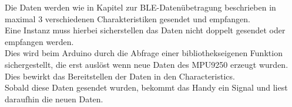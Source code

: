 Die Daten werden wie in Kapitel zur BLE-Datenübetragung beschrieben in maximal
3 verschiedenen Charakteristiken gesendet und empfangen. \\
Eine Instanz muss hierbei sicherstellen das Daten
nicht doppelt gesendet oder empfangen werden.\\
Dies wird beim Arduino durch die Abfrage einer bibliothekseigenen Funktion
sichergestellt, die erst auslöst wenn neue Daten des MPU9250 erzeugt wurden. Dies bewirkt
das Bereitstellen der Daten in den Characteristics.\\
Sobald diese Daten gesendet wurden, bekommt das Handy ein Signal und liest
daraufhin die neuen Daten.
